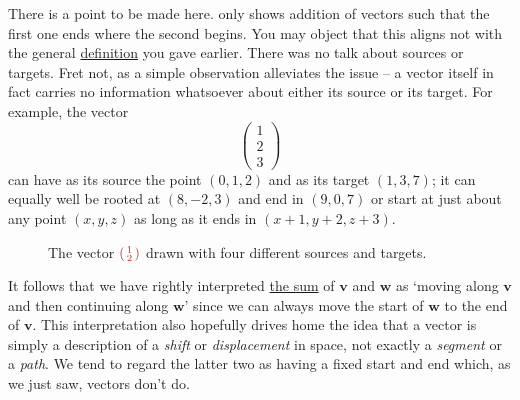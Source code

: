 There is a point to be made here.  only shows
addition of vectors such that the first one ends where the second begins. You
may object that this aligns not with the general
\hyperref[def:adding-vectors]{definition} you gave earlier. There was no talk
about sources or targets. Fret not, as a simple observation alleviates the issue
-- a vector itself in fact carries no information whatsoever about either its
source or its target. For example, the vector
\[
 \begin{pmatrix}
  1\\
  2\\
  3
 \end{pmatrix}
\]
can have as its source the point $(0, 1, 2)$ and as its target $(1, 3, 7)$; it
can equally well be rooted at $(8, -2, 3)$ and end in $(9, 0, 7)$ or start at
just about any point $(x,y,z)$ as long as it ends in $(x + 1, y + 2, z + 3)$.

\begin{figure}[ht]
 \centering
 \caption{The vector $\clr{\begin{psmallmatrix} 1 \\ 2 \end{psmallmatrix}}$
 drawn with four different sources and targets.}
 \label{fig:one-vector-four-positions}
\end{figure}

It follows that we have rightly interpreted \hyperref[def:adding-vectors]{the
sum} of $\mathbf{v}$ and $\mathbf{w}$ as `moving along $\mathbf{v}$ and then
continuing along $\mathbf{w}$' since we can always move the start of
$\mathbf{w}$ to the end of $\mathbf{v}$. This interpretation also hopefully
drives home the idea that a vector is simply a description of a \emph{shift} or
\emph{displacement} in space, not exactly a \emph{segment} or a \emph{path}. We
tend to regard the latter two as having a fixed start and end which, as we just
saw, vectors don't do.

